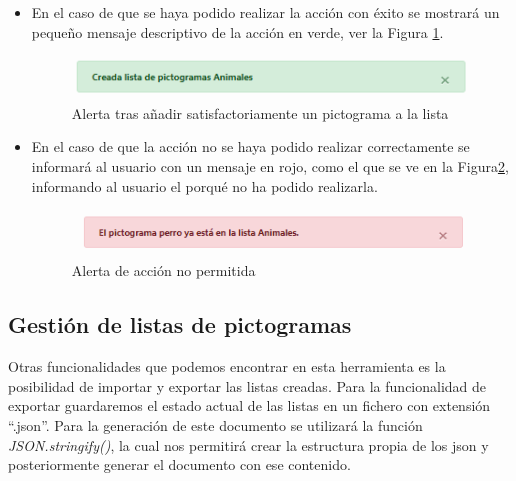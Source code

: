 \begin{itemize}
	\item En el caso de que se haya podido realizar la acción con éxito se mostrará un pequeño mensaje descriptivo de la acción en verde, ver la Figura \ref{fig:alertlistapicto}.
	
	\begin{figure}[h!]
		\centering
		\includegraphics[width=0.7\linewidth]{Imagenes/Bitmap/alertListaPicto}
		\caption{ Alerta tras añadir satisfactoriamente un pictograma a la lista}
		\label{fig:alertlistapicto}
	\end{figure}
	
	
	\item  En el caso de que la acción no se haya podido realizar correctamente se informará al usuario con un mensaje en rojo, como el que se ve en la Figura\ref{fig:alerterrorlistapicto}, informando al usuario el porqué no ha podido realizarla.
	
	\begin{figure}[h!]
		\centering
		\includegraphics[width=0.7\linewidth]{Imagenes/Bitmap/alertErrorListaPicto}
		\caption{Alerta de acción no permitida}
		\label{fig:alerterrorlistapicto}
	\end{figure}
	
	
	
\end{itemize}

\subsection{Gestión de listas de pictogramas}

Otras funcionalidades que podemos encontrar en esta herramienta es la posibilidad de importar y exportar las listas creadas.
Para la funcionalidad de exportar guardaremos el estado actual de las listas en un fichero con extensión “.json”. Para la generación de este documento se utilizará la función \textit{JSON.stringify()}, la cual nos permitirá crear la estructura propia de los json y posteriormente generar el documento con ese contenido.

